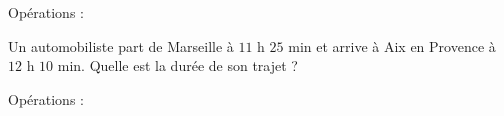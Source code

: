 \begin{pageAuto}
\begin{minipage}{0.68\linewidth}
\end{minipage}
\hfill \vrule \hfill 
\begin{minipage}{0.30\linewidth}Opérations :
\vspace{3cm}
\end{minipage}



\ExoAuto



\begin{minipage}{0.68\linewidth}

Un automobiliste part de Marseille à $11$ h $25$ min et arrive à Aix en Provence à $12$ h $10$ min.
Quelle est la durée de son trajet ? 
 
\end{minipage}
\hfill \vrule \hfill 
\begin{minipage}{0.30\linewidth}Opérations :
\vspace{3cm}
\end{minipage}

\end{pageAuto}


\begin{pageBrouillon} 
 

\end{pageBrouillon}
